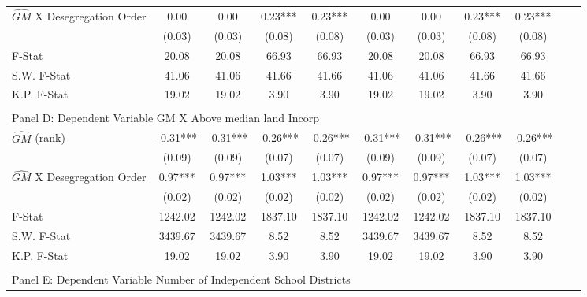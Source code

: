\begin{table}[htbp]
\begin{threeparttable}
\begin{tabular}{l*{10}{c}}
\addlinespace
$\hat{GM}$ X Desegregation Order&       0.00   &       0.00   &       0.23***&       0.23***&       0.00   &       0.00   &       0.23***&       0.23***\\
                &     (0.03)   &     (0.03)   &     (0.08)   &     (0.08)   &     (0.03)   &     (0.03)   &     (0.08)   &     (0.08)   \\
\midrule
F-Stat          &      20.08   &      20.08   &      66.93   &      66.93   &      20.08   &      20.08   &      66.93   &      66.93   \\
S.W. F-Stat     &      41.06   &      41.06   &      41.66   &      41.66   &      41.06   &      41.06   &      41.66   &      41.66   \\
K.P. F-Stat     &      19.02   &      19.02   &       3.90   &       3.90   &      19.02   &      19.02   &       3.90   &       3.90   \\
\cmidrule[\heavyrulewidth](lr){1-9} \\ \cmidrule[\heavyrulewidth](lr){1-9}
\multicolumn{8}{l}{Panel D: Dependent Variable GM X Above median land Incorp}\\
\cmidrule(lr){1-9}
$\hat{GM}$ (rank)&      -0.31***&      -0.31***&      -0.26***&      -0.26***&      -0.31***&      -0.31***&      -0.26***&      -0.26***\\
                &     (0.09)   &     (0.09)   &     (0.07)   &     (0.07)   &     (0.09)   &     (0.09)   &     (0.07)   &     (0.07)   \\
\addlinespace
$\hat{GM}$ X Desegregation Order&       0.97***&       0.97***&       1.03***&       1.03***&       0.97***&       0.97***&       1.03***&       1.03***\\
                &     (0.02)   &     (0.02)   &     (0.02)   &     (0.02)   &     (0.02)   &     (0.02)   &     (0.02)   &     (0.02)   \\
\midrule
F-Stat          &    1242.02   &    1242.02   &    1837.10   &    1837.10   &    1242.02   &    1242.02   &    1837.10   &    1837.10   \\
S.W. F-Stat     &    3439.67   &    3439.67   &       8.52   &       8.52   &    3439.67   &    3439.67   &       8.52   &       8.52   \\
K.P. F-Stat     &      19.02   &      19.02   &       3.90   &       3.90   &      19.02   &      19.02   &       3.90   &       3.90   \\
\cmidrule[\heavyrulewidth](lr){1-9} \\ \cmidrule[\heavyrulewidth](lr){1-9}
\multicolumn{8}{l}{Panel E: Dependent Variable Number of Independent School Districts}\\

\end{tabular}
\end{threeparttable}
\end{table}
